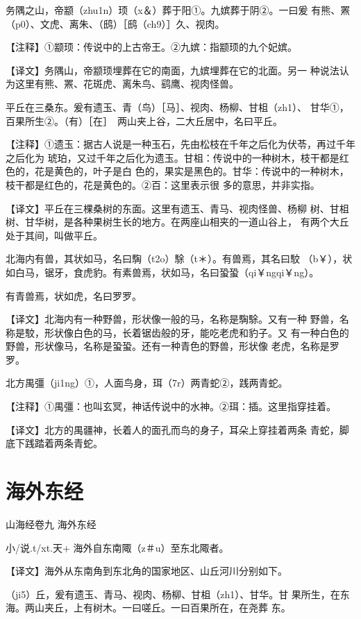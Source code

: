 \documentclass[a4paper,12pt,UTF8,twoside]{ctexbook}
\begin{document}
务隅之山，帝颛（zhu1n）顼（x＆）葬于阳①。九嫔葬于阴②。一曰爰 有熊、罴（p0）、文虎、离朱、（鸱）［鸱（ch9）］久、视肉。

【注释】①颛顼：传说中的上古帝王。②九嫔：指颛顼的九个妃嫔。

【译文】务隅山，帝颛顼埋葬在它的南面，九嫔埋葬在它的北面。另一 种说法认为这里有熊、罴、花斑虎、离朱鸟、鹞鹰、视肉怪兽。

平丘在三桑东。爰有遗玉、青（鸟）［马］、视肉、杨柳、甘柤（zh1）、 甘华①，百果所生②。（有）［在］　两山夹上谷，二大丘居中，名曰平丘。

【注释】①遗玉：据古人说是一种玉石，先由松枝在千年之后化为伏苓，再过千年之后化为 琥珀，又过千年之后化为遗玉。甘柤：传说中的一种树木，枝干都是红色的，花是黄色的，叶子是白 色的，果实是黑色的。甘华：传说中的一种树木，枝干都是红色的，花是黄色的。②百：这里表示很 多的意思，并非实指。

【译文】平丘在三棵桑树的东面。这里有遗玉、青马、视肉怪兽、杨柳 树、甘柤树、甘华树，是各种果树生长的地方。在两座山相夹的一道山谷上， 有两个大丘处于其间，叫做平丘。

北海内有兽，其状如马，名曰騊（t2o）駼（t＊）。有兽焉，其名曰駮 （b￥），状如白马，锯牙，食虎豹。有素兽焉，状如马，名曰蛩蛩（qi￥ngqi￥ng）。

有青兽焉，状如虎，名曰罗罗。

【译文】北海内有一种野兽，形状像一般的马，名称是騊駼。又有一种 野兽，名称是駮，形状像白色的马，长着锯齿般的牙，能吃老虎和豹子。又 有一种白色的野兽，形状像马，名称是蛩蛩。还有一种青色的野兽，形状像 老虎，名称是罗罗。

北方禺彊（ji1ng）①，人面鸟身，珥（7r）两青蛇②，践两青蛇。

【注释】①禺彊：也叫玄冥，神话传说中的水神。②珥：插。这里指穿挂着。

【译文】北方的禺疆神，长着人的面孔而鸟的身子，耳朵上穿挂着两条 青蛇，脚底下践踏着两条青蛇。

\chapter{海外东经}

山海经卷九 海外东经

小/说.t/xt.天+
海外自东南陬（z＃u）至东北陬者。

【译文】海外从东南角到东北角的国家地区、山丘河川分别如下。

（ji5）丘，爰有遗玉、青马、视肉、杨柳、甘柤（zh1）、甘华。甘 果所生，在东海。两山夹丘，上有树木。一曰嗟丘。一曰百果所在，在尧葬 东。
\end{document}
